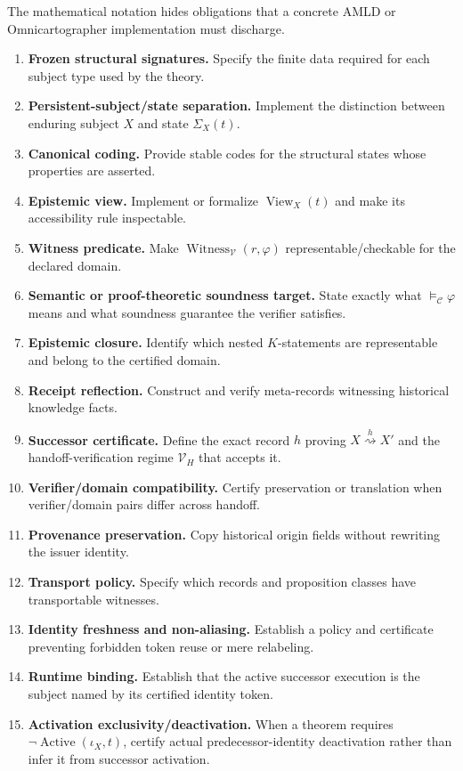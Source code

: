 \documentclass[11pt]{article}
\theoremstyle{remark}
\newcommand{\View}{\operatorname{View}}
\newcommand{\Witness}{\operatorname{Witness}}
\newcommand{\Active}{\operatorname{Active}}
\newcommand{\Sem}{\models_{\mathcal C}}
\newcommand{\handoff}{\mathrel{\overset{h}{\rightsquigarrow}}}
\begin{document}
The mathematical notation hides obligations that a concrete AMLD or Omnicartographer implementation must discharge.
\begin{enumerate}[label=(O\arabic*)]
\item \textbf{Frozen structural signatures.} Specify the finite data required for each subject type used by the theory.
\item \textbf{Persistent-subject/state separation.} Implement the distinction between enduring subject $X$ and state $\Sigma_X(t)$.
\item \textbf{Canonical coding.} Provide stable codes for the structural states whose properties are asserted.
\item \textbf{Epistemic view.} Implement or formalize $\View_X(t)$ and make its accessibility rule inspectable.
\item \textbf{Witness predicate.} Make $\Witness_{\mathcal V}(r,\varphi)$ representable/checkable for the declared domain.
\item \textbf{Semantic or proof-theoretic soundness target.} State exactly what $\Sem\varphi$ means and what soundness guarantee the verifier satisfies.
\item \textbf{Epistemic closure.} Identify which nested $K$-statements are representable and belong to the certified domain.
\item \textbf{Receipt reflection.} Construct and verify meta-records witnessing historical knowledge facts.
\item \textbf{Successor certificate.} Define the exact record $h$ proving $X\handoff X'$ and the handoff-verification regime $\mathcal V_H$ that accepts it.
\item \textbf{Verifier/domain compatibility.} Certify preservation or translation when verifier/domain pairs differ across handoff.
\item \textbf{Provenance preservation.} Copy historical origin fields without rewriting the issuer identity.
\item \textbf{Transport policy.} Specify which records and proposition classes have transportable witnesses.
\item \textbf{Identity freshness and non-aliasing.} Establish a policy and certificate preventing forbidden token reuse or mere relabeling.
\item \textbf{Runtime binding.} Establish that the active successor execution is the subject named by its certified identity token.
\item \textbf{Activation exclusivity/deactivation.} When a theorem requires $\neg\Active(\iota_X,t)$, certify actual predecessor-identity deactivation rather than infer it from successor activation.

\end{enumerate}
\end{document}
